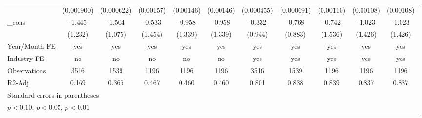 \begin{table}[htbp]
\begin{tabular}{l*{10}{c}}
                &(0.000900)         &(0.000622)         &(0.00157)         &(0.00146)         &(0.00146)         &(0.000455)         &(0.000691)         &(0.00110)         &(0.00108)         &(0.00108)         \\
\_cons          &   -1.445         &   -1.504         &   -0.533         &   -0.958         &   -0.958         &   -0.332         &   -0.768         &   -0.742         &   -1.023         &   -1.023         \\
                &  (1.232)         &  (1.075)         &  (1.454)         &  (1.339)         &  (1.339)         &  (0.944)         &  (0.883)         &  (1.536)         &  (1.426)         &  (1.426)         \\
\hline
Year/Month FE   &      yes         &      yes         &      yes         &      yes         &      yes         &      yes         &      yes         &      yes         &      yes         &      yes         \\
Industry FE     &       no         &       no         &       no         &       no         &       no         &      yes         &      yes         &      yes         &      yes         &      yes         \\
Observations    &     3516         &     1539         &     1196         &     1196         &     1196         &     3516         &     1539         &     1196         &     1196         &     1196         \\
R2-Adj          &    0.169         &    0.366         &    0.467         &    0.460         &    0.460         &    0.801         &    0.838         &    0.839         &    0.837         &    0.837         \\
\hline\hline
\multicolumn{11}{l}{\footnotesize Standard errors in parentheses}\\
\multicolumn{11}{l}{\footnotesize \sym{*} \(p<0.10\), \sym{**} \(p<0.05\), \sym{***} \(p<0.01\)}\\
\end{tabular}
\end{table}
